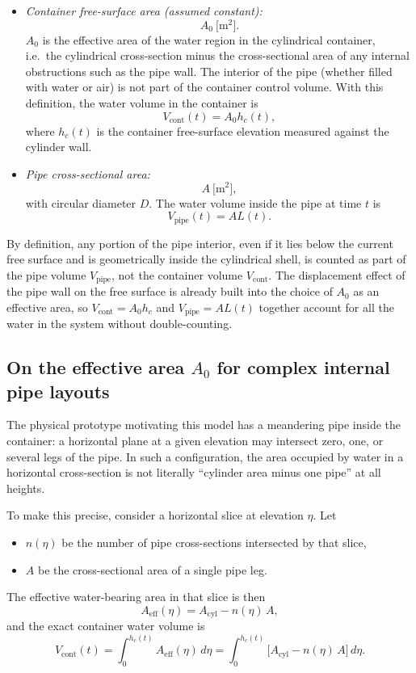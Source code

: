 \documentclass[11pt]{article}
\begin{document}
\begin{itemize}
  \item \emph{Container free-surface area (assumed constant):}
  \[
    A_0\ \text{[m$^2$]}.
  \]
  $A_0$ is the effective area of the water region in the cylindrical container, i.e.\ the
  cylindrical cross-section minus the cross-sectional area of any internal obstructions such
  as the pipe wall. The interior of the pipe (whether filled with water or air) is not part of
  the container control volume. With this definition, the water volume in the container is
  \[
    V_{\text{cont}}(t) = A_0 h_c(t),
  \]
  where $h_c(t)$ is the container free-surface elevation measured against the cylinder wall.
  \item \emph{Pipe cross-sectional area:}
  \[
    A\ \text{[m$^2$]},
  \]
  with circular diameter $D$. The water volume inside the pipe at time $t$ is
  \[
    V_{\text{pipe}}(t) = A L(t).
  \]
\end{itemize}

By definition, any portion of the pipe interior, even if it lies below the current free surface
and is geometrically inside the cylindrical shell, is counted as part of the pipe volume
$V_{\text{pipe}}$, not the container volume $V_{\text{cont}}$. The displacement effect of the
pipe wall on the free surface is already built into the choice of $A_0$ as an effective area,
so $V_{\text{cont}} = A_0 h_c$ and $V_{\text{pipe}} = A L(t)$ together account for all the
water in the system without double-counting.

\subsection{On the effective area $A_0$ for complex internal pipe layouts}

The physical prototype motivating this model has a meandering pipe inside the container: a
horizontal plane at a given elevation may intersect zero, one, or several legs of the pipe.
In such a configuration, the area occupied by water in a horizontal cross-section is not
literally ``cylinder area minus one pipe'' at all heights.

To make this precise, consider a horizontal slice at elevation $\eta$. Let
\begin{itemize}
  \item $n(\eta)$ be the number of pipe cross-sections intersected by that slice,
  \item $A$ be the cross-sectional area of a single pipe leg.
\end{itemize}
The effective water-bearing area in that slice is then
\[
  A_{\text{eff}}(\eta) = A_{\text{cyl}} - n(\eta)\,A,
\]
and the exact container water volume is
\[
  V_{\text{cont}}(t)
  = \int_0^{h_c(t)} A_{\text{eff}}(\eta)\,d\eta
  = \int_0^{h_c(t)} \bigl[A_{\text{cyl}} - n(\eta)\,A\bigr]\,d\eta.
\]
\end{document}
